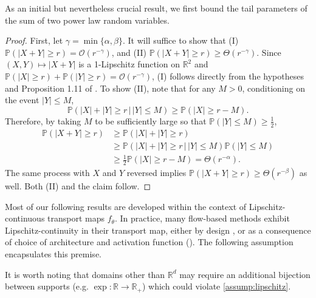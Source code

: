 \documentclass[../../thesis.tex]{subfiles}
\begin{document}
As an initial but nevertheless crucial result, we first bound the tail
parameters of the sum of two power law random variables.


\begin{proof}
  First, let $\gamma=\min\{\alpha,\beta\}$. It will suffice to show that (I) $\mathbb{P}(|X+Y|\geq r)=\mathcal{O}(r^{-\gamma})$, and (II) $\mathbb{P}(|X+Y|\geq r)\geq\Theta(r^{-\gamma})$. Since $(X,Y)\mapsto|X+Y|$ is a 1-Lipschitz function on $\mathbb{R}^{2}$ and $\mathbb{P}(|X|\geq r)+\mathbb{P}(|Y|\geq r)=\mathcal{O}(r^{-\gamma})$, (I) follows directly from the hypotheses and Proposition 1.11 of \citet{ledoux2001concentration}. To show (II), note that for any $M>0$, conditioning on the event $|Y|\leq M$,\[
    \mathbb{P}\left(\left|X\right|+|Y|\geq r\,\vert\,|Y|\leq M\right)\geq\mathbb{P}\left(\left|X\right|\geq r-M\right).
  \]
  Therefore, by taking $M$ to be sufficiently large so that $\mathbb{P}(|Y|\leq M)\geq\frac{1}{2}$,
  \begin{align*}
    \mathbb{P}\left(|X+Y|\geq r\right) & \geq\mathbb{P}\left(|X|+|Y|\geq r\right)                                                                         \\
                                       & \geq\mathbb{P}\left(\left|X\right|+|Y|\geq r\,\vert\,|Y|\leq M\right)\mathbb{P}\left(\left|Y\right|\leq M\right) \\
                                       & \geq\frac{1}{2}\mathbb{P}\left(\left|X\right|\geq r-M\right)=\Theta(r^{-\alpha}).
  \end{align*}
  The same process with $X$ and $Y$ reversed implies $\mathbb{P}(|X+Y|\geq r)\geq\Theta(r^{-\beta})$ as well. Both (II) and the claim follow.
\end{proof}

Most of our following results are developed within the context of Lipschitz-continuous transport maps $f_\theta$.
In practice, many flow-based methods exhibit Lipschitz-continuity in their transport map, either by design \citep{grathwohl2018ffjord,chen2019residual}, or as a consequence of choice of architecture and activation function (). %
%
The following assumption encapsulates this premise.
It is worth noting that domains other than $\mathbb{R}^d$ may require an additional bijection between supports (e.g. $\exp : \mathbb{R} \to \mathbb{R}_+$) which
could violate \cref{assump:lipschitz}.
\end{document}
